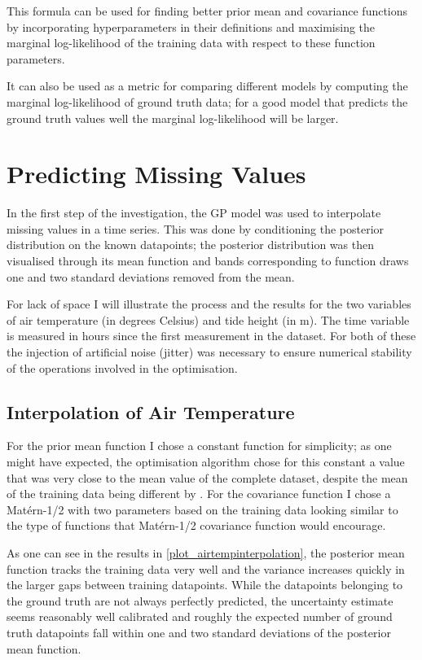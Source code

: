 \documentclass{article}
\begin{document}
            This formula can be used for finding better prior mean and covariance functions by incorporating hyperparameters in their definitions and maximising the marginal log-likelihood of the training data with respect to these function parameters.

            It can also be used as a metric for comparing different models by computing the marginal log-likelihood of ground truth data; for a good model that predicts the ground truth values well the marginal log-likelihood will be larger.

    \section{Predicting Missing Values} \label{sec_interpolation}

            In the first step of the investigation, the GP model was used to interpolate missing values in a time series. This was done by conditioning the posterior distribution on the known datapoints; the posterior distribution was then visualised through its mean function and bands corresponding to function draws one and two standard deviations removed from the mean.
    
            For lack of space I will illustrate the process and the results for the two variables of air temperature (in degrees Celsius) and tide height (in m). The time variable is measured in hours since the first measurement in the dataset. For both of these the injection of artificial noise (jitter) was necessary to ensure numerical stability of the operations involved in the optimisation.
            
            \subsection{Interpolation of Air Temperature}

                For the prior mean function I chose a constant function for simplicity; as one might have expected, the optimisation algorithm chose for this constant a value that was very close to the mean value of the complete dataset, despite the mean of the training data being different by %
                . For the covariance function I chose a Matérn-1/2 with two parameters based on the training data looking similar to the type of functions that Matérn-1/2 covariance function would encourage.

                As one can see in the results in \cref{plot_airtempinterpolation}, the posterior mean function tracks the training data very well and the variance increases quickly in the larger gaps between training datapoints. While the datapoints belonging to the ground truth are not always perfectly predicted, the uncertainty estimate seems reasonably well calibrated and roughly the expected number of ground truth datapoints fall within one and two standard deviations of the posterior mean function.
\end{document}
